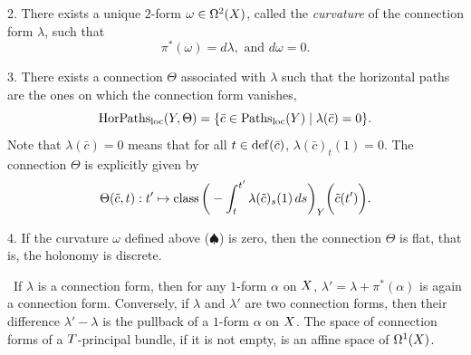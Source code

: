 \begin{article}
  2. There exists a unique $2$-form $\omega \in \Omega^2(X)$,
  called the {\em curvature} of the connection form $\lambda$,
  such that
  \begin{equation}
    \renewcommand{\theequation}{$\spadesuit$}
    \pi^*(\omega) = d\lambda, \text{ and } d\omega = 0.
  \end{equation}
  
  3. There exists a connection $\Theta$ associated with $\lambda$ such that the horizontal paths are the ones on which the connection form vanishes,
  \begin{equation}
    \renewcommand{\theequation}{$\diamondsuit$}
    \HorPaths_\loc(\Y,\Theta) = \{ \bar c \in \Paths_\loc(\Y) \mid \lambda(\bar c) = 0 \}.
  \end{equation}
  Note that $\lambda(\bar c)=0$ means that for all $t \in \mathrm{def}(\bar c)$,
  $\lambda(\bar c)_t(1) = 0$.
  The connection $\Theta$ is explicitly given by
  \begin{equation}
    \renewcommand{\theequation}{$\heartsuit$}
    \Theta(\tilde c,t) : t' \mapsto \class\bigg(-\int_{t}^{t'} \lambda(\tilde c)_s(1)\, ds\bigg)_\Y \bigg(\tilde c(t')\bigg).
  \end{equation}
  
  4. If the curvature $\omega$ defined above ($\spadesuit$) is zero,
  then the connection $\Theta$ is flat,
  that is,
  the holonomy  is discrete.
  
  \Note~If $\lambda$ is a connection form,
  then for any $1$-form $\alpha$ on $X$,
  $\lambda' = \lambda + \pi^*(\alpha)$ is again a connection form.
  Conversely,
  if $\lambda$ and $\lambda'$ are two connection forms, then their difference $\lambda' - \lambda$ is the pullback of a $1$-form $\alpha$ on $X$.
  The space of connection forms of a $T$-principal bundle,
  if it is not empty,
  is an affine space of $\Omega^{1}(X)$.
\end{article} %

